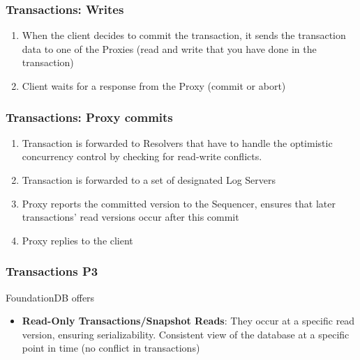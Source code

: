 \begin{frame}
	\frametitle{Transactions: Writes}
\begin{enumerate}
    \item When the client decides to commit the transaction, it sends the transaction data to one of the Proxies (read and write that you have done in the transaction)
    \item Client waits for a response from the Proxy (commit or abort)

\end{enumerate}

\end{frame}




\begin{frame}
	\frametitle{Transactions: Proxy commits}
\begin{enumerate}
    \item Transaction is forwarded to Resolvers that have to handle the optimistic concurrency control by checking for read-write conflicts.
    \item Transaction is forwarded to a set of designated Log Servers
    \item Proxy reports the committed version to the Sequencer, ensures that later transactions' read versions occur after this commit
    \item Proxy replies to the client
\end{enumerate}
\end{frame}


\begin{frame}
	\frametitle{Transactions P3}

 FoundationDB offers
 
 \begin{itemize}
     \item \textbf{Read-Only Transactions/Snapshot Reads}: They occur at a specific read version, ensuring serializability. Consistent view of the database at a specific point in time (no conflict in transactions)
 \end{itemize}

\end{frame}




